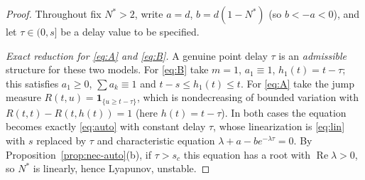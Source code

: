 \documentclass[12pt]{article}
\theoremstyle{definition}
\begin{document}
\begin{proof}
Throughout fix $N^*>2$, write $a=d$, $b=d(1-N^*)$ (so $b<-a<0$), and let
$\tau\in(0,s]$ be a delay value to be specified.

\emph{Exact reduction for \eqref{eq:A} and \eqref{eq:B}.} A genuine point delay
$\tau$ is an \emph{admissible} structure for these two models. For \eqref{eq:B}
take $m=1$, $a_1\equiv1$, $h_1(t)=t-\tau$; this satisfies $a_1\ge0$,
$\sum a_k\equiv1$ and $t-s\le h_1(t)\le t$. For \eqref{eq:A} take the jump
measure $R(t,u)=\mathbf 1_{\{u\ge t-\tau\}}$, which is nondecreasing of bounded
variation with $R(t,t)-R(t,h(t))=1$ (here $h(t)=t-\tau$). In both cases the
equation becomes exactly \eqref{eq:auto} with constant delay $\tau$, whose
linearization is \eqref{eq:lin} with $s$ replaced by $\tau$ and characteristic
equation $\lambda+a-be^{-\lambda\tau}=0$. By
Proposition~\ref{prop:nec-auto}(b), if $\tau>s_c$ this equation has a root with
$\operatorname{Re}\lambda>0$, so $N^*$ is linearly, hence Lyapunov, unstable.


\end{proof}
\end{document}
